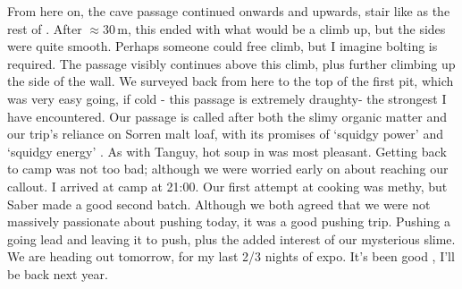 From here on, the cave passage continued onwards and upwards, stair like as the rest of . After $\approx30$\,m, this ended with what would be a climb up, but the sides were quite smooth. Perhaps someone could free climb, but I imagine bolting is required. The passage visibly continues above this climb, plus further climbing up the side of the wall. We surveyed back from here to  the top of the first pit, which was very easy going, if cold  - this passage is extremely draughty- the strongest I have encountered. Our passage is called   after both the slimy organic matter and our trip’s reliance on Sorren malt loaf, with its promises of ‘squidgy power’ and ‘squidgy energy’ . As with Tanguy, hot soup in  was most pleasant.
Getting back to camp was not too bad; although we were worried early on about reaching our callout. I arrived at camp at 21:00. Our first attempt at cooking was methy, but Saber made a good second batch. Although we both agreed that we were not massively passionate about pushing today, it was a good pushing trip. Pushing a going lead and leaving it to push, plus the added interest of our mysterious slime.
We are heading out tomorrow, for my last 2/3 nights of expo. It’s been good , I’ll be back next year.



\newpage
{}




